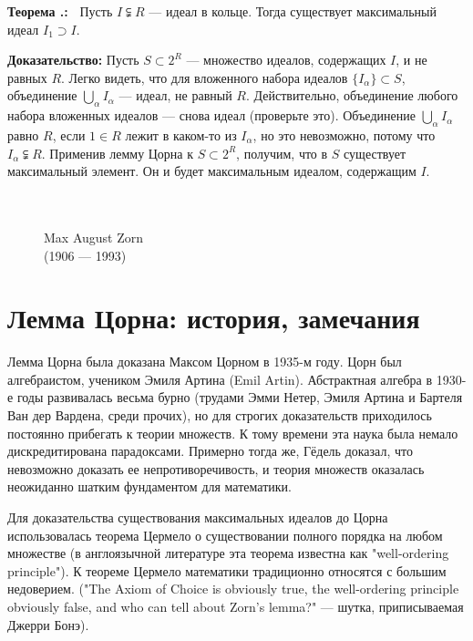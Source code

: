 \documentclass[12pt]{book}
\def\endproof{\hbox{\vrule width 5pt height 5pt depth 0pt}}
\theoremstyle{upshape}
\theoremstyle{generic}
\theoremstyle{upshapenonumber}
\newcommand{\следствие}{%
     \refstepcounter{teorema}
     {\noindent\bf Следствие \thechapter.\arabic{teorema}:\ }}
\newcommand{\пример}{%
     \refstepcounter{teorema}
     {\noindent\bf Пример \thechapter.\arabic{teorema}:\ }}
\newcommand{\лемма}{%
     \refstepcounter{teorema}
     {\noindent\bf Лемма \thechapter.\arabic{teorema}:\ }}
\newcommand{\теорема}{%
     \refstepcounter{teorema}
     {\noindent\bf Теорема \thechapter.\arabic{teorema}:\ }}
\newcommand{\утверждение}{%
     \refstepcounter{teorema}
     {\noindent\bf Утверждение \thechapter.\arabic{teorema}:\ }}
\def\хфилл{\hfill}
\def\ноиндент{\noindent}
\def\бф{\bf}
\begin{document}
\теорема
Пусть $I \subsetneqq R$ --- идеал в кольце.
Тогда существует максимальный идеал $I_1 \supset I$.

\хфилл

\ноиндент
{\бф Доказательство:} Пусть $S \subset 2^R$ --- множество
идеалов, содержащих $I$, и не равных $R$. Легко видеть,
что для вложенного набора идеалов $\{I_\alpha\}\subset S$,
объединение $\bigcup_\alpha I_\alpha$ --- идеал,
не равный $R$. Действительно, объединение
любого набора вложенных идеалов --- снова идеал 
(проверьте это). Объединение $\bigcup_\alpha I_\alpha$
равно $R$, если $1\in R$ лежит в каком-то из
$I_\alpha$, но это невозможно, потому что
$I_\alpha \subsetneqq R$. Применив
лемму Цорна к $S \subset 2^R$,
получим, что в $S$ существует
максимальный элемент. Он и будет
максимальным идеалом, содержащим $I$.
\endproof


\begin{figure}[ht]
\begin{center}\ \\
\\
{Max August Zorn\\
(1906 --- 1993)}
\end{center}
\end{figure}




\section{Лемма Цорна: история, замечания}


Лемма Цорна была доказана Максом Цорном в 1935-м году.
Цорн был алгебраистом, учеником Эмиля Артина (Emil
Artin). Абстрактная
алгебра в 1930-е годы развивалась весьма бурно 
(трудами Эмми Нетер, Эмиля Артина и Бартеля
Ван дер Вардена, среди прочих), но для строгих 
доказательств приходилось постоянно прибегать к теории
множеств. К тому времени эта наука
была немало дискредитирована парадоксами.
Примерно тогда же, Гёдель доказал, что невозможно
доказать ее непротиворечивость, и теория
множеств оказалась неожиданно шатким
фундаментом для математики. 

Для доказательства существования
максимальных идеалов до Цорна использовалась
теорема Цермело о существовании
полного порядка на любом множестве 
(в англоязычной литературе
эта теорема известна как "well-ordering principle").
К теореме Цермело математики традиционно
относятся с большим недоверием.
("The Axiom of Choice is obviously true, the well-ordering
principle obviously false, and who can tell about Zorn's
lemma?" --- шутка, приписываемая Джерри Бонэ).
\end{document}
